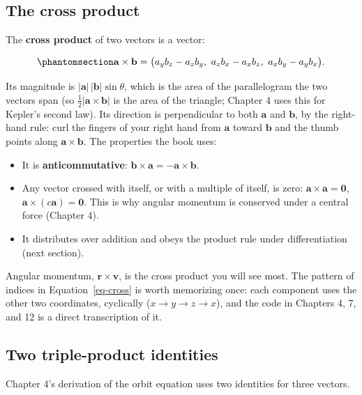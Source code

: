 \documentclass[
  10.5pt,
  letterpaper,
]{scrbook}
\providecommand{\tightlist}{%
  \setlength{\itemsep}{0pt}\setlength{\parskip}{0pt}}
\theoremstyle{plain}
\theoremstyle{remark}
\begin{document}
\subsection{The cross product}\label{the-cross-product}

The \textbf{cross product} of two vectors is a vector:

\begin{equation}\protect\phantomsection\label{eq-cross}{
\mathbf{a}\times\mathbf{b} = \big(a_y b_z - a_z b_y,\ a_z b_x - a_x b_z,\ a_x b_y - a_y b_x\big).
}\end{equation}

Its magnitude is \(|\mathbf{a}|\,|\mathbf{b}|\sin\theta\), which is the
area of the parallelogram the two vectors span (so
\(\tfrac12|\mathbf{a}\times\mathbf{b}|\) is the area of the triangle;
Chapter 4 uses this for Kepler's second law). Its direction is
perpendicular to both \(\mathbf{a}\) and \(\mathbf{b}\), by the
right-hand rule: curl the fingers of your right hand from \(\mathbf{a}\)
toward \(\mathbf{b}\) and the thumb points along
\(\mathbf{a}\times\mathbf{b}\). The properties the book uses:

\begin{itemize}
\tightlist
\item
  It is \textbf{anticommutative}:
  \(\mathbf{b}\times\mathbf{a} = -\mathbf{a}\times\mathbf{b}\).
\item
  Any vector crossed with itself, or with a multiple of itself, is zero:
  \(\mathbf{a}\times\mathbf{a} = \mathbf{0}\),
  \(\mathbf{a}\times(c\mathbf{a}) = \mathbf{0}\). This is why angular
  momentum is conserved under a central force (Chapter 4).
\item
  It distributes over addition and obeys the product rule under
  differentiation (next section).
\end{itemize}

Angular momentum, \(\mathbf{r}\times\mathbf{v}\), is the cross product
you will see most. The pattern of indices in Equation~\ref{eq-cross} is
worth memorizing once: each component uses the other two coordinates,
cyclically (\(x \to y \to z \to x\)), and the code in Chapters 4, 7, and
12 is a direct transcription of it.

\subsection{Two triple-product
identities}\label{two-triple-product-identities}

Chapter 4's derivation of the orbit equation uses two identities for
three vectors.
\end{document}
